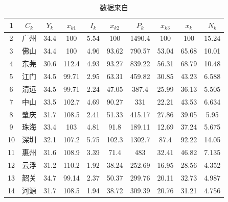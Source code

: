 \documentclass[UTF8,12pt]{ctexart}
\begin{document}
            \begin{table}[H]
                \centering
                \caption{数据来自\cite{CSSJ}}\label{PF}
                  \begin{tabular}{cccccccccc}
                  \toprule
                  1      & $C_k$ & $Y_k$ & $x_{k1}$ & $I_k$ & $x_{k2}$ & $P_k$ & $x_{k3}$ & $x_k$ & $N_k$ \\
                  \midrule
                  2      & 广州     & 34.4   & 100    & 5.54   & 100    & 1490.4 & 100    & 100    & 15.24 \\
                  \midrule
                  3      & 佛山     & 34.4   & 100    & 4.96   & 93.62  & 790.57 & 53.04  & 65.68  & 10.01 \\
                  \midrule
                  4      & 东莞     & 30.6   & 112.4  & 4.93   & 93.27  & 839.22 & 56.31  & 68.79  & 10.48 \\
                  \midrule
                  5      & 江门     & 34.5   & 99.71  & 2.95   & 63.31  & 459.82 & 30.85  & 43.23  & 6.588 \\
                  \midrule
                  6      & 清远     & 34.5   & 99.71  & 2.24   & 47.05  & 387.4  & 25.99  & 36.13  & 5.505 \\
                  \midrule
                  7      & 中山     & 33.5   & 102.7  & 4.69   & 90.27  & 331    & 22.21  & 43.53  & 6.634 \\
                  \midrule
                  8      & 肇庆     & 31.7   & 108.5  & 2.41   & 51.33  & 415.17 & 27.86  & 39.05  & 5.95 \\
                  \midrule
                  9      & 珠海     & 33.4   & 103    & 4.81   & 91.8   & 189.11 & 12.69  & 37.24  & 5.675 \\
                  \midrule
                  10     & 深圳     & 32.1   & 107.2  & 5.75   & 102.3  & 1302.7 & 87.4   & 92.22  & 14.05 \\
                  \midrule
                  11     & 惠州     & 31.6   & 108.9  & 3.39   & 71.4   & 483    & 32.41  & 46.82  & 7.135 \\
                  \midrule
                  12     & 云浮     & 31.2   & 110.2  & 1.92   & 38.24  & 252.69 & 16.95  & 28.56  & 4.352 \\
                  \midrule
                  13     & 韶关     & 34.7   & 99.14  & 2.37   & 50.37  & 299.76 & 20.11  & 32.73  & 4.987 \\
                  \midrule
                  14     & 河源     & 31.7   & 108.5  & 1.94   & 38.72  & 309.39 & 20.76  & 31.21  & 4.756 \\

\end{tabular}
\end{table}
\end{document}
